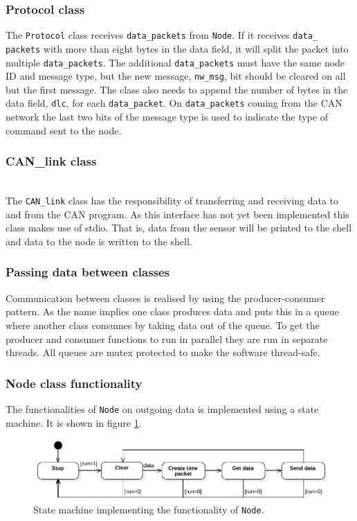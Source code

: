 \subsubsection*{Protocol class}

The \texttt{Protocol} class receives \texttt{data\_packets} from \texttt{Node}. 
If it receives \texttt{data\_} \texttt{packets} with more than eight bytes in the data field, it will split the packet into multiple \texttt{data\_packets}.
The additional \texttt{data\_packets} must have the same node ID and message type, but the new message, \texttt{nw\_msg}, bit should be cleared on all but the first message.
The class also needs to append the number of bytes in the data field, \texttt{dlc}, for each \texttt{data\_packet}.
On \texttt{data\_packets} coming from the CAN network the last two bits of the message type is used to indicate the type of command sent to the node.

\subsubsection*{CAN\_link class} ~ \\
The \texttt{CAN\_link} class has the responsibility of transferring and receiving data to and from the CAN program.
As this interface has not yet been implemented this class makes use of stdio. 
That is, data from the sensor will be printed to the shell and data to the node is written to the shell. 
\subsubsection*{Passing data between classes}
Communication between classes is realised by using the producer-consumer pattern.
As the name implies one class produces data and puts this in a queue where another class consumes by taking data out of the queue.
To get the producer and consumer functions to run in parallel they are run in separate threads.
All queues are mutex protected to make the software thread-safe.

\subsubsection*{Node class functionality}
The functionalities of \texttt{Node} on outgoing data is implemented using a state machine.
It is shown in figure \ref{fig:state_machine}.
\begin{figure}[!h]
\centering
\includegraphics[width=1\textwidth]{graphics/StateDiagram_Node.pdf}
\caption{State machine implementing the functionality of \texttt{Node}. }
\label{fig:state_machine}
\end{figure}

